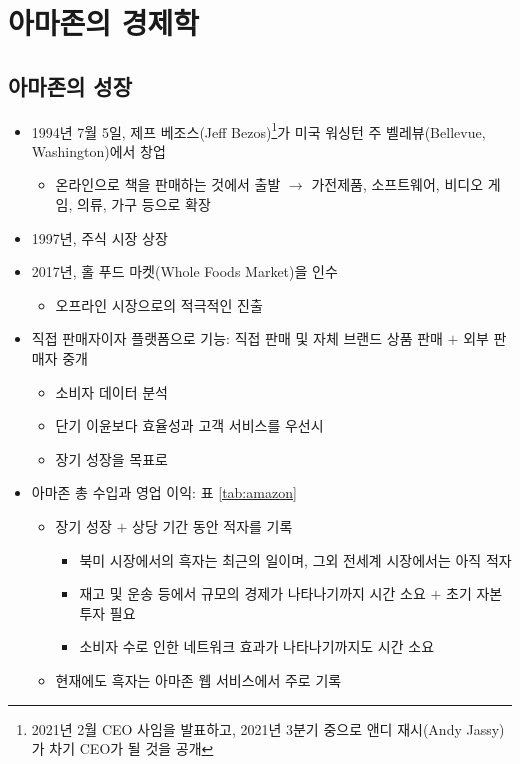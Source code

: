 \section{아마존의 경제학}\label{sec:amazon}
\subsection{아마존의 성장}
\begin{itemize}
\item 1994년 7월 5일, 제프 베조스(Jeff Bezos)\footnote{2021년 2월 CEO 사임을 발표하고, 2021년 3분기 중으로 앤디 재시(Andy Jassy)가 차기 CEO가 될 것을 공개}가 미국 워싱턴 주 벨레뷰(Bellevue, Washington)에서 창업 \citep{Stone:2013aa}
	\begin{itemize}
	\item 온라인으로 책을 판매하는 것에서 출발 $\rightarrow$ 가전제품, 소프트웨어, 비디오 게임, 의류, 가구 등으로 확장
	\end{itemize}
\item 1997년, 주식 시장 상장
\item 2017년, 홀 푸드 마켓(Whole Foods Market)을 인수
	\begin{itemize}
	\item 오프라인 시장으로의 적극적인 진출
	\end{itemize}
\item 직접 판매자이자 플랫폼으로 기능: 직접 판매 및 자체 브랜드 상품 판매 $+$ 외부 판매자 중개 
	\begin{itemize}
	\item 소비자 데이터 분석
	\item 단기 이윤보다 효율성과 고객 서비스를 우선시
	\item 장기 성장을 목표로
	\end{itemize}
\item 아마존 총 수입과 영업 이익: 표 \ref{tab:amazon}
	\begin{itemize}
	\item 장기 성장 $+$ 상당 기간 동안 적자를 기록 
		\begin{itemize}
		\item 북미 시장에서의 흑자는 최근의 일이며, 그외 전세계 시장에서는 아직 적자
		\item 재고 및 운송 등에서 규모의 경제가 나타나기까지 시간 소요 $+$ 초기 자본 투자 필요
		\item 소비자 수로 인한 네트워크 효과가 나타나기까지도 시간 소요
		\end{itemize}
	\item 현재에도 흑자는 아마존 웹 서비스에서 주로 기록

\end{itemize}
\end{itemize}
